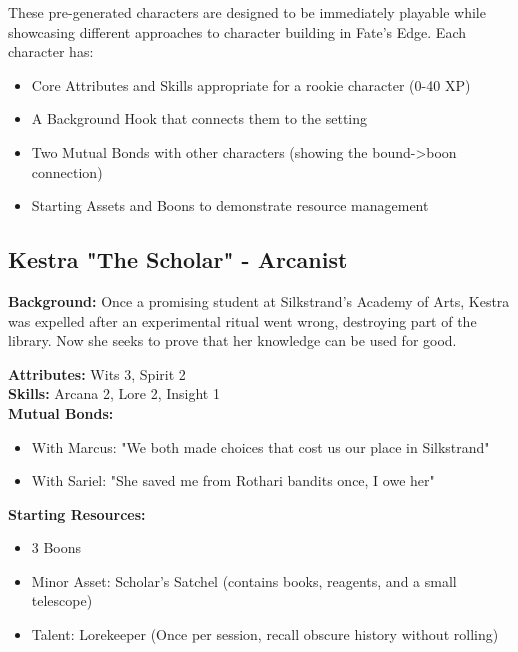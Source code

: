 \documentclass[11pt]{article}
\newenvironment{characterbox}[1]{%
  \begin{mdframed}[backgroundcolor=shadecolor, linewidth=1pt, linecolor=headercolor]%
  \subsection*{#1}%
}{%
  \end{mdframed}%
}
\begin{document}
These pre-generated characters are designed to be immediately playable while showcasing different approaches to character building in Fate's Edge. Each character has:
\begin{itemize}
\item Core Attributes and Skills appropriate for a rookie character (0-40 XP)
\item A Background Hook that connects them to the setting
\item Two Mutual Bonds with other characters (showing the bound->boon connection)
\item Starting Assets and Boons to demonstrate resource management
\end{itemize}

\begin{characterbox}{Kestra "The Scholar" - Arcanist}
\textbf{Background:} Once a promising student at Silkstrand's Academy of Arts, Kestra was expelled after an experimental ritual went wrong, destroying part of the library. Now she seeks to prove that her knowledge can be used for good.

\textbf{Attributes:} Wits 3, Spirit 2 \\
\textbf{Skills:} Arcana 2, Lore 2, Insight 1 \\
\textbf{Mutual Bonds:} 
\begin{itemize}
\item With Marcus: "We both made choices that cost us our place in Silkstrand"
\item With Sariel: "She saved me from Rothari bandits once, I owe her"
\end{itemize}

\textbf{Starting Resources:}
\begin{itemize}
\item 3 Boons
\item Minor Asset: Scholar's Satchel (contains books, reagents, and a small telescope)
\item Talent: Lorekeeper (Once per session, recall obscure history without rolling)
\end{itemize}
\end{characterbox}
\end{document}
